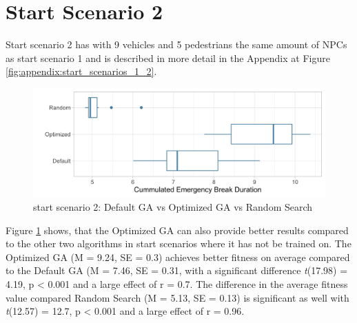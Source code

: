 \section{Start Scenario 2}
Start scenario 2 has with 9 vehicles and 5 pedestrians the same amount of NPCs as start scenario 1 and is described in more detail in the Appendix at Figure \ref{fig:appendix:start_scenarios_1_2}.

\begin{figure}[ht] 
	\includegraphics[width=1\linewidth]{simulations/evaluation/plots/sim_2_comparison}
	\caption{start scenario 2: Default GA vs Optimized GA vs Random Search}
	\label{fig:evaluation:sim_2_comparison}
\end{figure}

Figure \ref{fig:evaluation:sim_2_comparison} shows, that the Optimized GA can also provide better results compared to the other two algorithms in start scenarios where it has not be trained on. The Optimized GA (M = 9.24, SE = 0.3) achieves better fitness on average compared to the Default GA (M = 7.46, SE = 0.31, with a significant difference \textit{t}(17.98) = 4.19, p < 0.001 and a large effect of r = 0.7. The difference in the average fitness value compared Random Search (M = 5.13, SE = 0.13) is significant as well with \textit{t}(12.57) = 12.7, p < 0.001 and a large effect of r = 0.96.

